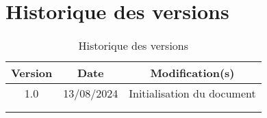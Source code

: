 \section*{Historique des versions}


    \begin{table}[!htb]
            \centering
            \begin{tabular}{|c|c|c|}
                 \hline Version & Date & Modification(s)\\
                 \hline 1.0 & 13/08/2024 & Initialisation du document \\
                 \hline & & \\
                 \hline & & \\
                 \hline
            \end{tabular}
            \caption{Historique des versions}
            \label{tab:HistVersions}
        \end{table}
